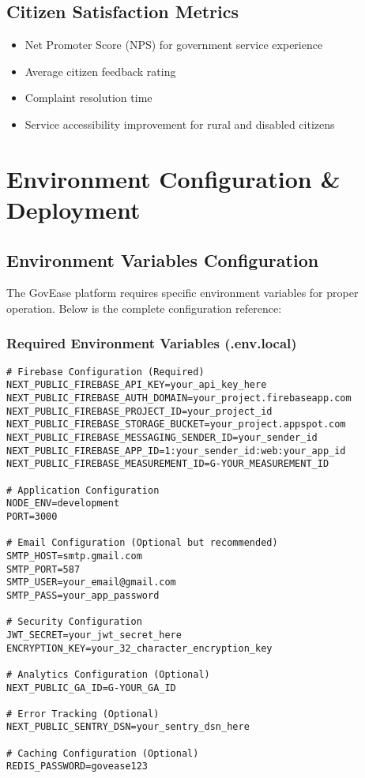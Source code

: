 \documentclass[12pt,a4paper]{article}
\begin{document}
\subsection{Citizen Satisfaction Metrics}
\begin{itemize}[leftmargin=*]
    \item Net Promoter Score (NPS) for government service experience
    \item Average citizen feedback rating
    \item Complaint resolution time
    \item Service accessibility improvement for rural and disabled citizens
\end{itemize}

\section{Environment Configuration \& Deployment}

\subsection{Environment Variables Configuration}

The GovEase platform requires specific environment variables for proper operation. Below is the complete configuration reference:

\subsubsection{Required Environment Variables (.env.local)}

\begin{verbatim}
# Firebase Configuration (Required)
NEXT_PUBLIC_FIREBASE_API_KEY=your_api_key_here
NEXT_PUBLIC_FIREBASE_AUTH_DOMAIN=your_project.firebaseapp.com
NEXT_PUBLIC_FIREBASE_PROJECT_ID=your_project_id
NEXT_PUBLIC_FIREBASE_STORAGE_BUCKET=your_project.appspot.com
NEXT_PUBLIC_FIREBASE_MESSAGING_SENDER_ID=your_sender_id
NEXT_PUBLIC_FIREBASE_APP_ID=1:your_sender_id:web:your_app_id
NEXT_PUBLIC_FIREBASE_MEASUREMENT_ID=G-YOUR_MEASUREMENT_ID

# Application Configuration
NODE_ENV=development
PORT=3000

# Email Configuration (Optional but recommended)
SMTP_HOST=smtp.gmail.com
SMTP_PORT=587
SMTP_USER=your_email@gmail.com
SMTP_PASS=your_app_password

# Security Configuration
JWT_SECRET=your_jwt_secret_here
ENCRYPTION_KEY=your_32_character_encryption_key

# Analytics Configuration (Optional)
NEXT_PUBLIC_GA_ID=G-YOUR_GA_ID

# Error Tracking (Optional)
NEXT_PUBLIC_SENTRY_DSN=your_sentry_dsn_here

# Caching Configuration (Optional)
REDIS_PASSWORD=govease123
\end{verbatim}
\end{document}
